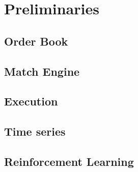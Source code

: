 \chapter{Preliminaries}
\label{chap:preliminaries}

\section{Order Book}

\section{Match Engine}

\section{Execution}

\section{Time series}

\section{Reinforcement Learning}